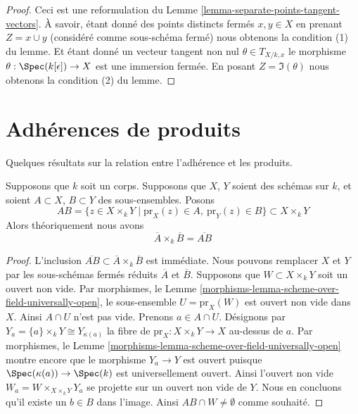 \begin{proof}
Ceci est une reformulation du Lemme
\ref{lemma-separate-points-tangent-vectors}. À
savoir, étant donné des points distincts fermés $x, y
\in X$ en prenant $Z = x \cup y$ (considéré comme
sous-schéma fermé) nous obtenons la condition (1) du
lemme. Et étant donné un vecteur tangent non nul
$\theta \in T_{X/k, x}$ le morphisme $\theta :
\Spec(k[\epsilon]) \to X$ est une immersion fermée. En
posant $Z = \Im(\theta)$ nous obtenons la condition (2) du lemme.
\end{proof}









\section{Adhérences de produits}
\label{section-closure-of-products}

\noindent
Quelques résultats sur la relation entre l'adhérence et les produits.

\begin{lemma}
\label{lemma-closure-of-product}
Supposons que $k$ soit un corps.
Supposons que $X$, $Y$ soient des
schémas sur $k$, et soient $A \subset X$,
$B \subset Y$ des sous-ensembles. Posons
$$
AB =
\{z \in X \times_k Y \mid \text{pr}_X(z) \in A, \ \text{pr}_Y(z) \in B\}
\subset X \times_k Y
$$
Alors théoriquement nous avons
$$
\overline{A} \times_k \overline{B} = \overline{AB}
$$
\end{lemma}

\begin{proof}
L'inclusion $\overline{AB} \subset \overline{A}
\times_k \overline{B}$ est immédiate. Nous pouvons
remplacer $X$ et $Y$ par les sous-schémas fermés réduits
$\overline{A}$ et $\overline{B}$. Supposons que $W
\subset X \times_k Y$ soit un ouvert non vide. Par
morphismes, le Lemme
\ref{morphisms-lemma-scheme-over-field-universally-open}, le
sous-ensemble $U = \text{pr}_X(W)$ est ouvert non vide dans
$X$. Ainsi $A \cap U$ n'est pas vide. Prenons $a \in A \cap
U$. Désignons par $Y_a = \{a\} \times_k Y \cong
Y_{\kappa(a)}$ la fibre de $\text{pr}_X : X \times_k Y \to X$
au-dessus de $a$. Par morphismes, le Lemme
\ref{morphisms-lemma-scheme-over-field-universally-open} montre
encore que le morphisme $Y_a \to Y$ est ouvert puisque
$\Spec(\kappa(a)) \to \Spec(k)$ est universellement ouvert. Ainsi
l'ouvert non vide $W_a = W \times_{X \times_k Y} Y_a$ se projette
sur un ouvert non vide de $Y$. Nous en concluons qu'il existe un $b
\in B$ dans l'image. Ainsi $AB \cap W \not = \emptyset$ comme souhaité.
\end{proof}

